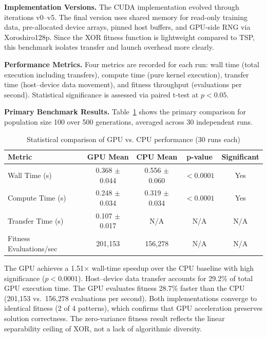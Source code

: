 \textbf{Implementation Versions.} The CUDA implementation evolved through iterations v0--v5. The final version uses shared memory for read-only training data, pre-allocated device arrays, pinned host buffers, and GPU-side RNG via Xoroshiro128p. Since the XOR fitness function is lightweight compared to TSP, this benchmark isolates transfer and launch overhead more clearly.

\textbf{Performance Metrics.} Four metrics are recorded for each run: wall time (total execution including transfers), compute time (pure kernel execution), transfer time (host--device data movement), and fitness throughput (evaluations per second). Statistical significance is assessed via paired t-test at $p < 0.05$.


\textbf{Primary Benchmark Results.} Table~\ref{tab:primary_results} shows the primary comparison for population size 100 over 500 generations, averaged across 30 independent runs.

\begin{table}[H]
\centering
\caption{Statistical comparison of GPU vs. CPU performance (30 runs each)}
\label{tab:primary_results}
\begin{tabular}{@{}lcccc@{}}
\toprule
\textbf{Metric} & \textbf{GPU Mean} & \textbf{CPU Mean} & \textbf{p-value} & \textbf{Significant} \\
\midrule
Wall Time (s) & 0.368 $\pm$ 0.044 & 0.556 $\pm$ 0.060 & $< 0.0001$ & Yes \\
Compute Time (s) & 0.248 $\pm$ 0.034 & 0.319 $\pm$ 0.034 & $< 0.0001$ & Yes \\
Transfer Time (s) & 0.107 $\pm$ 0.017 & N/A & N/A & N/A \\
Fitness Evaluations/sec & 201,153 & 156,278 & N/A & N/A \\
\bottomrule
\end{tabular}
\end{table}

The GPU achieves a 1.51$\times$ wall-time speedup over the CPU baseline with high significance ($p < 0.0001$). Host--device data transfer accounts for 29.2\% of total GPU execution time. The GPU evaluates fitness 28.7\% faster than the CPU (201,153 vs.\ 156,278 evaluations per second). Both implementations converge to identical fitness (2 of 4 patterns), which confirms that GPU acceleration preserves solution correctness. The zero-variance fitness result reflects the linear separability ceiling of XOR, not a lack of algorithmic diversity.

